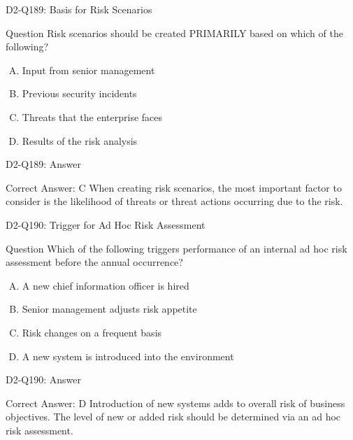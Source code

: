 \documentclass{beamer}
\begin{document}
	\begin{frame}{D2-Q189: Basis for Risk Scenarios}
		\begin{block}{Question}
			Risk scenarios should be created PRIMARILY based on which of the following?
		\end{block}
		\begin{enumerate}[(A)]
			\item Input from senior management
			\item Previous security incidents
			\item Threats that the enterprise faces
			\item Results of the risk analysis
		\end{enumerate}
	\end{frame}
	\begin{frame}{D2-Q189: Answer}
		\begin{block}{Correct Answer: C}
			When creating risk scenarios, the most important factor to consider is the likelihood of threats or threat actions occurring due to the risk.
		\end{block}
	\end{frame}
	
	\begin{frame}{D2-Q190: Trigger for Ad Hoc Risk Assessment}
		\begin{block}{Question}
			Which of the following triggers performance of an internal ad hoc risk assessment before the annual occurrence?
		\end{block}
		\begin{enumerate}[(A)]
			\item A new chief information officer is hired
			\item Senior management adjusts risk appetite
			\item Risk changes on a frequent basis
			\item A new system is introduced into the environment
		\end{enumerate}
	\end{frame}
	\begin{frame}{D2-Q190: Answer}
		\begin{block}{Correct Answer: D}
			Introduction of new systems adds to overall risk of business objectives. The level of new or added risk should be determined via an ad hoc risk assessment.
		\end{block}
	\end{frame}
	
\end{document}
